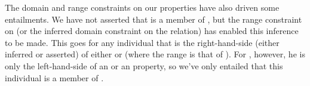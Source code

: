 
The domain and range constraints on our properties have also driven some entailments. We have not asserted that \ids is a member of \man, but the range constraint on  (or the inferred domain constraint on the  relation) has enabled this inference to be made. This goes for any individual that is the right-hand-side (either inferred or asserted) of either  or  (where the range is that of \woman). For \rds, however, he is only the left-hand-side of an  or an  property, so we've only entailed that this individual is a member of \person.

% 

